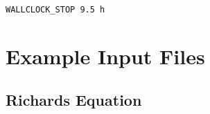 \documentclass[12pt]{article}
\begin{document}
\begin{mdframed}

 {\tt WALLCLOCK\_STOP 9.5 h}

\end{mdframed}


\hyperlink{target_key}{\return}

\newpage


\section{Example Input Files}

\subsection{Richards Equation}
\end{document}
